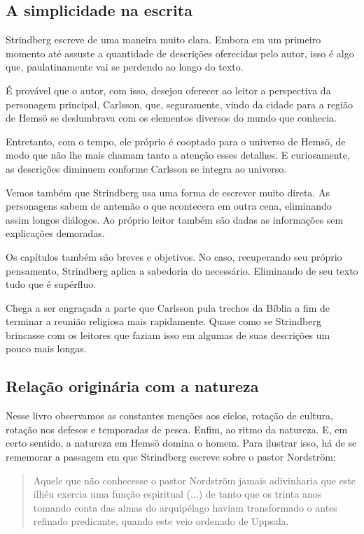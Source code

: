 \documentclass[12pt]{extarticle}
\begin{document}
\subsection{A simplicidade na escrita}

Strindberg escreve de uma maneira muito clara. Embora em um primeiro
momento até assuste a quantidade de descrições oferecidas pelo autor,
isso é algo que, paulatinamente vai se perdendo ao longo do texto.

É provável que o autor, com isso, desejou oferecer ao leitor a
perspectiva da personagem principal, Carlsson, que, seguramente, vindo
da cidade para a região de Hemsö se deslumbrava com os elementos
diversos do mundo que conhecia.

Entretanto, com o tempo, ele próprio é cooptado para o universo de
Hemsö, de modo que não lhe mais chamam tanto a atenção esses detalhes. E
curiosamente, as descrições diminuem conforme Carlsson se integra ao
universo.

Vemos também que Strindberg usa uma forma de escrever muito direta. As
personagens sabem de antemão o que acontecera em outra cena, eliminando
assim longos diálogos. Ao próprio leitor também são dadas as informações
sem explicações demoradas.

Os capítulos também são breves e objetivos. No caso, recuperando seu
próprio pensamento, Strindberg aplica a sabedoria do necessário.
Eliminando de seu texto tudo que é supérfluo.

Chega a ser engraçada a parte que Carlsson pula trechos da Bíblia a fim
de terminar a reunião religiosa mais rapidamente. Quase como se
Strindberg brincasse com os leitores que faziam isso em algumas de suas
descrições um pouco mais longas.

\subsection{Relação originária com a natureza}

Nesse livro observamos as constantes menções aos ciclos, rotação de
cultura, rotação nos defesos e temporadas de pesca. Enfim, ao ritmo da
natureza. E, em certo sentido, a natureza em Hemsö domina o homem. Para
ilustrar isso, há de se rememorar a passagem em que Strindberg escreve
sobre o pastor Nordström:

\begin{quote}
Aquele que não conhecesse o pastor Nordström jamais adivinharia que este
ilhéu exercia uma função espiritual (...) de tanto que os trinta anos
tomando conta das almas do arquipélago haviam transformado o antes
refinado predicante, quando este veio ordenado de Uppsala.
\end{quote}
\end{document}
